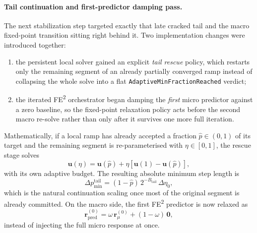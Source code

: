 \paragraph{Tail continuation and first-predictor damping pass.}
The next stabilization step targeted exactly that late cracked tail and the
macro fixed-point transition sitting right behind it.  Two implementation
changes were introduced together:
\begin{enumerate}
  \item the persistent local solver gained an explicit \emph{tail rescue}
    policy, which restarts only the remaining segment of an already partially
    converged ramp instead of collapsing the whole solve into a flat
    \texttt{AdaptiveMinFractionReached} verdict;
  \item the iterated FE\textsuperscript{2} orchestrator began damping the
    \emph{first} micro predictor against a zero baseline, so the fixed-point
    relaxation policy acts before the second macro re-solve rather than only
    after it survives one more full iteration.
\end{enumerate}

Mathematically, if a local ramp has already accepted a fraction
\(\hat{p}\in(0,1)\) of its target and the remaining segment is re-parameterised
with \(\eta\in[0,1]\), the rescue stage solves
\begin{equation}
  \mathbf{u}(\eta)
  = \mathbf{u}(\hat{p})
    + \eta\left[\mathbf{u}(1)-\mathbf{u}(\hat{p})\right],
\end{equation}
with its own adaptive budget.  The resulting absolute minimum step length is
\begin{equation}
  \Delta p_{\min}^{\text{tail}}
  = (1-\hat{p})\,2^{-B_{\text{tail}}}\,\Delta\eta_0,
\end{equation}
which is the natural continuation scaling once most of the original segment is
already committed.  On the macro side, the first FE\textsuperscript{2}
predictor is now relaxed as
\begin{equation}
  \mathbf{r}_{\text{pred}}^{(0)}
  = \omega\,\mathbf{r}_{\mu}^{(0)}
    + (1-\omega)\,\mathbf{0},
\end{equation}
instead of injecting the full micro response at once.


